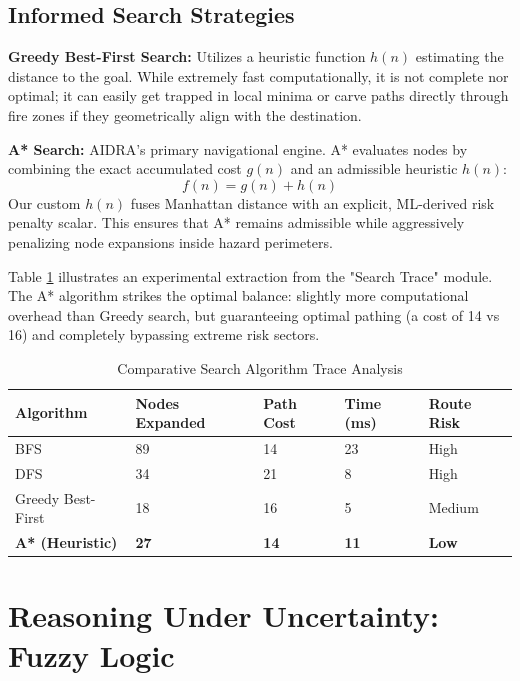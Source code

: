 \documentclass[conference]{IEEEtran}
\begin{document}
\subsection{Informed Search Strategies}
\textbf{Greedy Best-First Search:} Utilizes a heuristic function $h(n)$ estimating the distance to the goal. While extremely fast computationally, it is not complete nor optimal; it can easily get trapped in local minima or carve paths directly through fire zones if they geometrically align with the destination.

\textbf{A* Search:} AIDRA's primary navigational engine. A* evaluates nodes by combining the exact accumulated cost $g(n)$ and an admissible heuristic $h(n)$:
\begin{equation}
    f(n) = g(n) + h(n)
\end{equation}
Our custom $h(n)$ fuses Manhattan distance with an explicit, ML-derived risk penalty scalar. This ensures that A* remains admissible while aggressively penalizing node expansions inside hazard perimeters. 

Table \ref{tab:search_eval} illustrates an experimental extraction from the "Search Trace" module. The A* algorithm strikes the optimal balance: slightly more computational overhead than Greedy search, but guaranteeing optimal pathing (a cost of 14 vs 16) and completely bypassing extreme risk sectors.

\begin{table}[htbp]
\caption{Comparative Search Algorithm Trace Analysis}
\label{tab:search_eval}
\centering
\renewcommand{\arraystretch}{1.2}
\begin{tabularx}{\columnwidth}{@{}lXXXX@{}}
\toprule
\textbf{Algorithm} & \textbf{Nodes Expanded} & \textbf{Path Cost} & \textbf{Time (ms)} & \textbf{Route Risk} \\ \midrule
BFS & 89 & 14 & 23 & High \\
DFS & 34 & 21 & 8 & High \\
Greedy Best-First & 18 & 16 & 5 & Medium \\
\textbf{A* (Heuristic)} & \textbf{27} & \textbf{14} & \textbf{11} & \textbf{Low} \\ \bottomrule
\end{tabularx}
\end{table}

\section{Reasoning Under Uncertainty: Fuzzy Logic}
\end{document}
